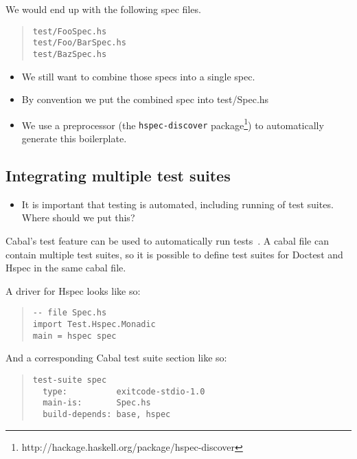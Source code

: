 \documentclass[preprint]{sigplanconf}
\begin{document}
\noindent We would end up with the following spec files.

\begin{quote}
\small
\begin{verbatim}
test/FooSpec.hs
test/Foo/BarSpec.hs
test/BazSpec.hs
\end{verbatim}
\end{quote}

\begin{itemize}
\item We still want to combine those specs into a single spec.
\item By convention we put the combined spec into test/Spec.hs
\end{itemize}


\begin{itemize}
\item We use a preprocessor (the {\tt hspec-discover} package\footnote{%
http://hackage.haskell.org/package/hspec-discover}) to automatically generate this boilerplate.
\end{itemize}

\subsection{Integrating multiple test suites}

\begin{itemize}

\item It is important that testing is automated, including running of test
    suites.  Where should we put this?
\end{itemize}

\noindent Cabal's test feature can be used to automatically run tests~\cite{cabal}.  A cabal
file can contain multiple test suites, so it is possible to define test suites
for Doctest and Hspec in the same cabal file.

A driver for Hspec looks like so:

\begin{quote}
\small
\begin{verbatim}
-- file Spec.hs
import Test.Hspec.Monadic
main = hspec spec
\end{verbatim}
\end{quote}

\noindent And a corresponding Cabal test suite section like so:

\begin{quote}
\small
\begin{verbatim}
test-suite spec
  type:          exitcode-stdio-1.0
  main-is:       Spec.hs
  build-depends: base, hspec
\end{verbatim}
\end{quote}
\end{document}
